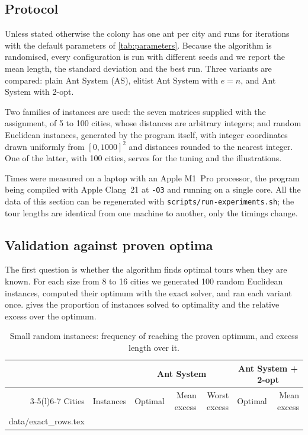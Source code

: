 \documentclass[11pt,a4paper]{article}
\makeatletter
\newcommand{\code}[1]{\texttt{#1}}
\newcommand{\inputrows}[1]{\@@input #1 }
\makeatother
\begin{document}
\subsection{Protocol}

Unless stated otherwise the colony has one ant per city and runs for
\ExperimentIterations{} iterations with the default parameters of
\cref{tab:parameters}. Because the algorithm is randomised, every configuration is run
with \ExperimentRuns{} different seeds and we report the mean length, the standard
deviation and the best run. Three variants are compared: plain Ant System (AS), elitist
Ant System with $e=n$, and Ant System with 2-opt.

Two families of instances are used: the seven matrices supplied with the assignment, of 5
to 100 cities, whose distances are arbitrary integers; and random Euclidean instances,
generated by the program itself, with integer coordinates drawn uniformly from
$[0,1000]^2$ and distances rounded to the nearest integer. One of the latter, with 100
cities, serves for the tuning and the illustrations.

Times were measured on a laptop with an Apple M1~Pro processor, the program being compiled
with Apple Clang~21 at \code{-O3} and running on a single core. All the data of this
section can be regenerated with \code{scripts/run-experiments.sh}; the tour lengths are
identical from one machine to another, only the timings change.

\subsection{Validation against proven optima}
\label{sec:validation}

The first question is whether the algorithm finds optimal tours when they are known.
For each size from 8 to 16 cities we generated 100 random Euclidean instances, computed
their optimum with the exact solver, and ran each variant once.  gives
the proportion of instances solved to optimality and the relative excess over the optimum.

\begin{table}[htbp]
    \centering
    \caption{Small random instances: frequency of reaching the proven optimum, and excess
        length over it.}
    \label{tab:exact}
    \begin{tabular}{@{}rrrrrrr@{}}
        \toprule
               &           & \multicolumn{3}{c}{Ant System} & \multicolumn{2}{c}{Ant System + 2-opt}                                        \\
        \cmidrule(lr){3-5}\cmidrule(l){6-7}
        Cities & Instances & Optimal                        & Mean excess                            & Worst excess & Optimal & Mean excess \\
        \midrule
        \inputrows{data/exact_rows.tex}
        \bottomrule
    \end{tabular}
\end{table}
\end{document}
